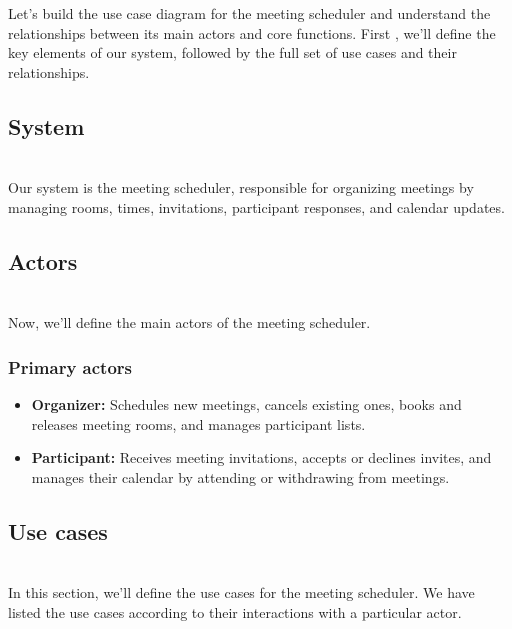 

Let's build the use case diagram for the meeting scheduler and understand the relationships between its main actors and core functions. First , we'll define the key elements of our system, followed by the full set of use cases and their relationships.

\subsection{System}\label{sQvpPOxXVjYK9n1Pk7YHQ}
\\
Our system is the meeting scheduler, responsible for organizing meetings by managing rooms, times, invitations, participant responses, and calendar updates.

\subsection{Actors}\label{sIu0GUc5o_4jhcmRtOkWa}
\\
Now, we'll define the main actors of the meeting scheduler.

\subsubsection{Primary actors}\label{7JcZBu97wGrjDeEiFlgHy}

\begin{itemize}
\item
\protect{}\label{Tu4IQdKFjW4QDUxsBzI_r}
\textbf{Organizer:} Schedules new meetings, cancels existing ones, books and releases meeting rooms, and manages participant lists.
\item
\protect{}\label{6v8LtVIBCPk_jTHbzYCUF}
\textbf{Participant:} Receives meeting invitations, accepts or declines invites, and manages their calendar by attending or withdrawing from meetings.
\end{itemize}

\subsection{Use cases}\label{o5G9nJkAGwGof-Tx15M4Y}
\\
In this section, we'll define the use cases for the meeting scheduler. We have listed the use cases according to their interactions with a particular actor.

